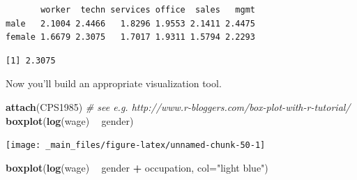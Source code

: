 \documentclass[
]{book}
\newenvironment{Shaded}{\begin{snugshade}}{\end{snugshade}}
\newcommand{\CommentTok}[1]{\textcolor[rgb]{0.56,0.35,0.01}{\textit{#1}}}
\newcommand{\DataTypeTok}[1]{\textcolor[rgb]{0.13,0.29,0.53}{#1}}
\newcommand{\KeywordTok}[1]{\textcolor[rgb]{0.13,0.29,0.53}{\textbf{#1}}}
\newcommand{\NormalTok}[1]{#1}
\newcommand{\OperatorTok}[1]{\textcolor[rgb]{0.81,0.36,0.00}{\textbf{#1}}}
\newcommand{\StringTok}[1]{\textcolor[rgb]{0.31,0.60,0.02}{#1}}
\begin{document}
\begin{verbatim}
       worker  techn services office  sales   mgmt
male   2.1004 2.4466   1.8296 1.9553 2.1411 2.4475
female 1.6679 2.3075   1.7017 1.9311 1.5794 2.2293
\end{verbatim}

\begin{Shaded}
\end{Shaded}

\begin{verbatim}
[1] 2.3075
\end{verbatim}

Now you'll build an appropriate visualization tool.

\begin{Shaded}
\begin{Highlighting}[]
\KeywordTok{attach}\NormalTok{(CPS1985)}
\CommentTok{# see e.g. http://www.r-bloggers.com/box-plot-with-r-tutorial/}
\KeywordTok{boxplot}\NormalTok{(}\KeywordTok{log}\NormalTok{(wage) }\OperatorTok{~}\StringTok{ }\NormalTok{gender)}
\end{Highlighting}
\end{Shaded}

\begin{center}\texttt{[image: \_main\_files/figure-latex/unnamed-chunk-50-1]} \end{center}

\begin{Shaded}
\begin{Highlighting}[]
\KeywordTok{boxplot}\NormalTok{(}\KeywordTok{log}\NormalTok{(wage) }\OperatorTok{~}\StringTok{ }\NormalTok{gender }\OperatorTok{+}\StringTok{ }\NormalTok{occupation, }\DataTypeTok{col=}\StringTok{"light blue"}\NormalTok{)}
\end{Highlighting}
\end{Shaded}
\end{document}

